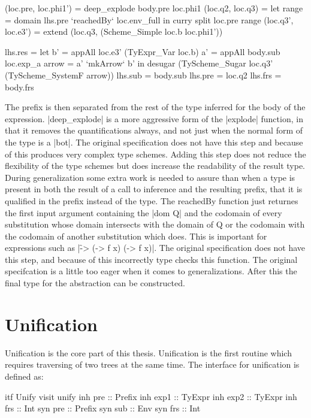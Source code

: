 \begin{code}
(loc.pre, loc.phi1')  = deep_explode body.pre loc.phi1
(loc.q2,  loc.q3)     =  let range = domain lhs.pre `reachedBy` loc.env_full
                         in curry split loc.pre range
(loc.q3', loc.e3')    = extend (loc.q3, (Scheme_Simple loc.b loc.phi1'))
    
lhs.res =  let  b'     = appAll loc.e3' (TyExpr_Var loc.b)
                a'     = appAll body.sub loc.exp_a
                arrow  = a' `mkArrow` b'
           in desugar (TyScheme_Sugar loc.q3' (TyScheme_SystemF arrow))
lhs.sub  = body.sub
lhs.pre  = loc.q2
lhs.frs  = body.frs
\end{code}
The prefix is then separated from the rest of the type inferred for the body of the expression. |deep_explode| is a more aggressive form of the |explode| function, in that it removes the quantifications always, and not just when the normal form of the type is a |bot|. The original specification does not have this step and because of this produces very complex type schemes. Adding this step does not reduce the flexibility of the type schemes but does increase the readability of the result type. 
During generalization some extra work is needed to assure than when a type is present in both the result of a call to inference and the resulting prefix, that it is qualified in the prefix instead of the type.
The reachedBy function just returnes the first input argument containing the |dom Q| and the codomain of every substitution whose domain intersects with the domain of Q or the codomain with the codomain of another substitution which does. This is important for expressions such as |\f -> (\x -> f x) (\x -> f x)|. The original specification does not have this step, and because of this incorrectly type checks this function. The original specifcation is a little too eager when it comes to generalizations. After this the final type for the abstraction can be constructed.

\section{Unification}
Unification is the core part of this thesis. Unification is the first routine which requires traversing of two trees at the same time. The interface for unification is defined as:

\begin{code}
itf Unify
  visit unify
    inh pre   :: Prefix
    inh exp1  :: TyExpr
    inh exp2  :: TyExpr
    inh frs   :: Int
    syn pre   :: Prefix
    syn sub   :: Env
    syn frs   :: Int
\end{code}


